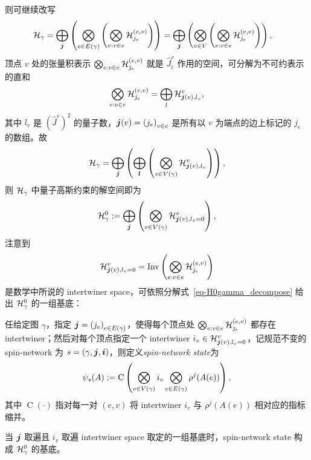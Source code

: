 		则可继续改写
		\begin{equation}
			\begin{split}
				\mathcal{H}_\gamma &= \bigoplus_{\vb*{j}} \left( \bigotimes_{e\in E(\gamma)} \left( \bigotimes_{\substack{v:v\in e}} \mathcal{H}_{j_e}^{(e,v)} \right) \right) = \bigoplus_{\vb*{j}} \left( \bigotimes_{v\in V} \left( \bigotimes_{\substack{e:v\in e}} \mathcal{H}_{j_e}^{(e,v)} \right) \right),
			\end{split}
		\end{equation}
		顶点 $v$ 处的张量积表示 $\bigotimes_{\substack{e:v\in e}} \mathcal{H}_{j_e}^{(e,v)}$ 就是 $\hat{J}_i^{v}$ 作用的空间，可分解为不可约表示的直和
		\begin{equation}
			\bigotimes_{\substack{e:v\in e}} \mathcal{H}_{j_e}^{(e,v)} = \bigoplus_{l} \mathcal{H}_{\vb*{j}(v),l_v}^{v},
		\end{equation}
		其中 $l_v$ 是 $\left( \hat{J}^{v} \right)^2$ 的量子数，$\vb*{j}(v) = \left( j_e \right)_{v\in e}$ 是所有以 $v$ 为端点的边上标记的 $j_e$ 的数组。故
		\begin{equation}
			\mathcal{H}_\gamma = \bigoplus_{\vb*{j}} \left( \bigoplus_{\vb*{l}} \left( \bigotimes_{v\in V(\gamma)} \mathcal{H}_{\vb*{j}(v),l_v}^{v} \right) \right),
		\end{equation}
		则 $\mathcal{H}_\gamma$ 中量子高斯约束的解空间即为
		\begin{equation}
			\mathcal{H}_\gamma^0 := \bigoplus_{\vb*{j}} \left( \bigotimes_{v\in V(\gamma)} \mathcal{H}_{\vb*{j}(v),l_v=0}^{v} \right),\label{eq-H0gamma_decompose}
		\end{equation}
		注意到
		\begin{equation}
			\mathcal{H}_{\vb*{j}(v),l_v=0}^{v} = \operatorname{Inv}\left( \bigotimes_{\substack{e:v\in e}} \mathcal{H}_{j_e}^{(e,v)} \right)
		\end{equation}
		是数学中所说的 intertwiner space，可依照分解式~\eqref{eq-H0gamma_decompose} 给出 $\mathcal{H}_\gamma^0$ 的一组基底：
		\begin{Definition}
			任给定图 $\gamma$，指定 $\vb*{j} = \left( j_e \right)_{e\in E(\gamma)}$，使得每个顶点处 $\bigotimes_{\substack{e:v\in e}} \mathcal{H}_{j_e}^{(e,v)}$ 都存在 intertwiner；然后对每个顶点指定一个 intertwiner $i_v \in \mathcal{H}_{\vb*{j}(v),l_v=0}^{v}$，记规范不变的spin-network 为 $s=(\gamma,\vb*{j},\vb*{i})$，则定义\emph{spin-network state}为
			\begin{equation}
				\psi_s(A) := \operatorname{C} \left( \bigotimes_{v\in V(\gamma)} i_v \bigotimes_{e\in E(\gamma)} \rho^j(A(e)) \right),
			\end{equation}
			其中 $\operatorname{C}(\cdot)$ 指对每一对 $(e,v)$ 将 intertwiner $i_v$ 与 $\rho^j(A(e))$ 相对应的指标缩并。

			当 $\vb*{j}$ 取遍且 $i_v$ 取遍 intertwiner space 取定的一组基底时，spin-network state 构成 $\mathcal{H}_\gamma^0$ 的基底。
		\end{Definition}
